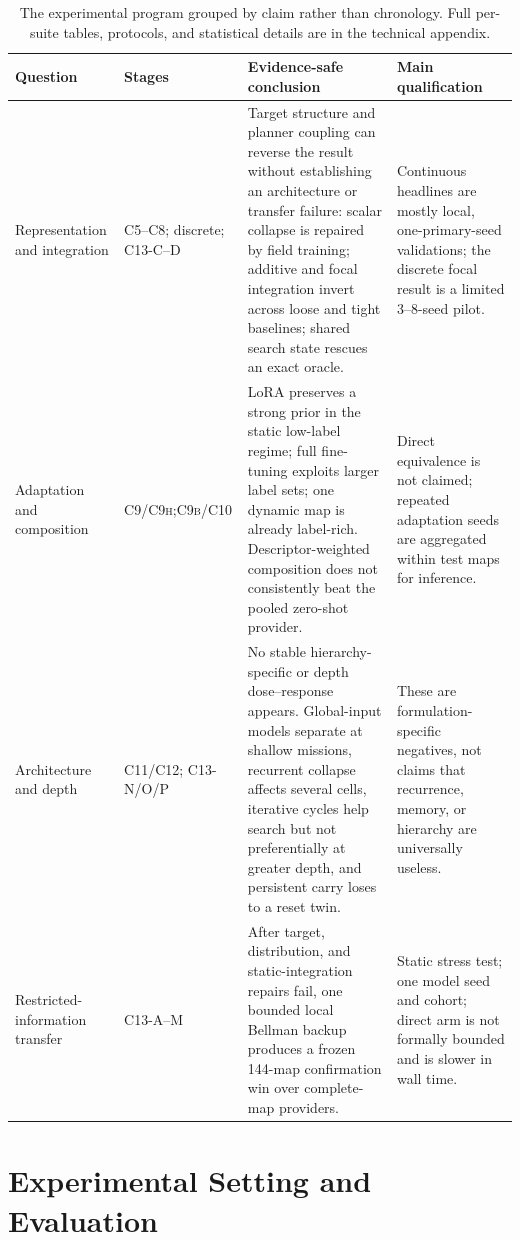 \documentclass[letterpaper]{article} %
\newcommand{\stage}[1]{\textsc{#1}}
\begin{document}
\begin{table}[t]
\centering
\footnotesize
\begin{tabular}{@{}p{2.3cm}p{2.0cm}p{7.3cm}p{4.2cm}@{}}
\toprule
Question & Stages & Evidence-safe conclusion & Main qualification \\
\midrule
Representation and integration & \stage{C5--C8}; discrete; \stage{C13-C--D} & Target structure and planner coupling can reverse the result without establishing an architecture or transfer failure: scalar collapse is repaired by field training; additive and focal integration invert across loose and tight baselines; shared search state rescues an exact oracle. & Continuous headlines are mostly local, one-primary-seed validations; the discrete focal result is a limited 3--8-seed pilot. \\
Adaptation and composition & \stage{C9/C9h};\newline\stage{C9b/C10} & LoRA preserves a strong prior in the static low-label regime; full fine-tuning exploits larger label sets; one dynamic map is already label-rich. Descriptor-weighted composition does not consistently beat the pooled zero-shot provider. & Direct equivalence is not claimed; repeated adaptation seeds are aggregated within test maps for inference. \\
Architecture and depth & \stage{C11/C12}; \stage{C13-N/O/P} & No stable hierarchy-specific or depth dose--response appears. Global-input models separate at shallow missions, recurrent collapse affects several cells, iterative cycles help search but not preferentially at greater depth, and persistent carry loses to a reset twin. & These are formulation-specific negatives, not claims that recurrence, memory, or hierarchy are universally useless. \\
Restricted-information transfer & \stage{C13-A--M} & After target, distribution, and static-integration repairs fail, one bounded local Bellman backup produces a frozen 144-map confirmation win over complete-map providers. & Static stress test; one model seed and cohort; direct arm is not formally bounded and is slower in wall time. \\
\bottomrule
\end{tabular}
\caption{The experimental program grouped by claim rather than chronology. Full per-suite tables, protocols, and statistical details are in the technical appendix.}
\label{tab:matrix}
\end{table}

\section{Experimental Setting and Evaluation}
\end{document}
